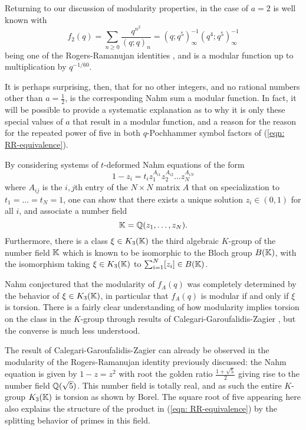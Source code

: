 Returning to our discussion of modularity properties, in the case of $a=2$ is well known with 
\begin{equation}\label{eqn: RR-equivalence}
    f_{2}(q)=\sum_{n\geq0}\frac{q^{n^{2}}}{(q;q)_{n}}=(q;q^{5})_{\infty}^{-1}(q^{4};q^{5})^{-1}_{\infty}
\end{equation}
being one of the Rogers-Ramanujan identities \cite{OEIS-1}, and is a modular function up to multiplication by $q^{-1/60}$. 

It is perhaps surprising, then, that for no other integers, and no rational numbers other than $a=\frac{1}{2}$, is the corresponding Nahm sum a modular function. In fact, it will be possible to provide a systematic explanation as to why it is only these special values of $a$ that result in a modular function, and a reason for the reason for the repeated power of five in both $q$-Pochhammer symbol factors of (\ref{eqn: RR-equivalence}). 

By considering systems of $t$-deformed Nahm equations of the form 
$$1-z_{i}=t_{i}z_{1}^{A_{i1}}z_{2}^{A_{i2}}\dots z_{N}^{A_{iN}}$$
where $A_{ij}$ is the $i,j$th entry of the $N\times N$ matrix $A$ that on specialization to $t_{1}=\dots=t_{N}=1$, one can show that there exists a unique solution $z_{i}\in(0,1)$ for all $i$, and associate a number field 
\begin{equation}\label{eqn: number field of Nahm equation}
    \mathbb{K}=\mathbb{Q}(z_{1},\dots,z_{N}).
\end{equation}
Furthermore, there is a class $\xi\in K_{3}(\mathbb{K})$ the third algebraic $K$-group of the number field $\mathbb{K}$ which is known to be isomorphic to the Bloch group $B(\mathbb{K})$, with the isomorphism taking $\xi\in K_{3}(\mathbb{K})$ to $\sum_{i=1}^{N}[z_{i}]\in B(\mathbb{K})$.

Nahm conjectured that the modularity of $f_{A}(q)$ was completely determined by the behavior of $\xi\in K_{3}(\mathbb{K})$, in particular that $f_{A}(q)$ is modular if and only if $\xi$ is torsion. There is a fairly clear understanding of how modularity implies torsion on the class in the $K$-group through results of Calegari-Garoufalidis-Zagier \cite{BlochGroupsNahm}, but the converse is much less understood. 

The result of Calegari-Garoufalidis-Zagier can already be observed in the modularity of the Rogers-Ramanujan identity previously discussed: the Nahm equation is given by $1-z=z^{2}$ with root the golden ratio $\frac{1+\sqrt{5}}{2}$ giving rise to the number field $\mathbb{Q}(\sqrt{5})$. This number field is totally real, and as such the entire $K$-group $K_{3}(\mathbb{K})$ is torsion as shown by Borel. The square root of five appearing here also explains the structure of the product in (\ref{eqn: RR-equivalence}) by the splitting behavior of primes in this field. 

